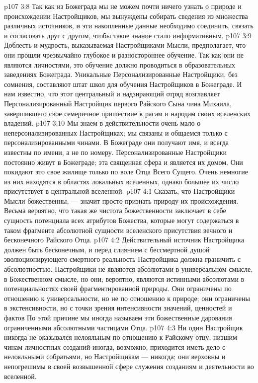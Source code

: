 \vs p107 3:8 Так как из Божеграда мы не можем почти ничего узнать о природе и происхождении Настройщиков, мы вынуждены собирать сведения из множества различных источников, и эти накопленные данные необходимо соединить, связать и согласовать друг с другом, чтобы такое знание стало информативным.
\vs p107 3:9 Доблесть и мудрость, выказываемая Настройщиками Мысли, предполагает, что они прошли чрезвычайно глубокое и разностороннее обучение. Так как они не являются личностями, это обучение должно проводиться в образовательных заведениях Божеграда. Уникальные Персонализированные Настройщики, без сомнения, составляют штат школ для обучения Настройщиков в Божеграде. И нам известно, что этот центральный и надзирающий отряд возглавляет Персонализированный Настройщик первого Райского Сына чина Михаила, завершившего свое семеричное пришествие к расам и народам своих вселенских владений.
\vs p107 3:10 Мы знаем в действительности очень мало о неперсонализированных Настройщиках; мы связаны и общаемся только с персонализированными чинами. В Божеграде они получают имя, и всегда известны по имени, а не по номеру. Персонализированные Настройщики постоянно живут в Божеграде; эта священная сфера и является их домом. Они покидают это свое жилище только по воле Отца Всего Сущего. Очень немногие из них находятся в областях локальных вселенных, однако большее их число присутствует в центральной вселенной.
\vs p107 4:1 Сказать, что Настройщики Мысли божественны, --- значит просто признать природу их происхождения. Весьма вероятно, что такая же чистота божественности заключает в себе сущность потенциала всех атрибутов Божества, которые могут содержаться в таком фрагменте абсолютной сущности вселенского присутствия вечного и бесконечного Райского Отца.
\vs p107 4:2 Действительный источник Настройщика должен быть бесконечным, и перед слиянием с бессмертной душой эволюционирующего смертного реальность Настройщика должна граничить с абсолютностью. Настройщики не являются абсолютами в универсальном смысле, в Божественном смысле, но они, вероятно, являются истинными абсолютами в потенциальностях своей фрагментированной природы. Они ограничены по отношению к универсальности, но не по отношению к природе; они ограничены в экстенсивности, но с точки зрения интенсивности значений, ценностей и фактов  По этой причине мы иногда называем эти божественные дарования ограниченными абсолютными частицами Отца.
\vs p107 4:3 Ни один Настройщик никогда не оказывался нелояльным по отношению к Райскому отцу; низшим чинам личностных созданий иногда, возможно, приходится иметь дело с нелояльными собратьями, но Настройщикам --- никогда; они верховны и непогрешимы в своей возвышенной сфере служения созданиям и деятельности во вселенной.
